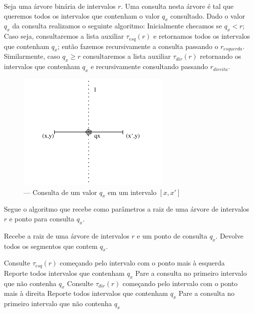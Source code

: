 Seja uma árvore binária de intervalos $r$. Uma consulta nesta árvore é tal que queremos todos os intervalos que contenham o valor $q_x$ consultado.
Dado o valor $q_x$ da consulta realizamos o seguinte algoritmo: Inicialmente checamos se $q_x < r$; Caso seja, consultaremos a lista auxiliar $\tau_{esq}(r)$ e retornamos todos os intervalos que contenham $q_x$; então fazemos recursivamente a consulta passando o $r_{esquerda}$. Similarmente, caso $q_x \geq r $  consultaremos a lista auxiliar $\tau_{dir}(r)$ retornando os intervalos que contenham $q_x$ e recursivamente consultando passando $r_{direita}$.

\begin{figure}[h!]
    \begin{center}
        \includegraphics[scale=1.5]{images/interval_tree_query.pdf}
    \end{center}
    \caption{ — Consulta de um valor $q_x$ em um intervalo $[x, x']$}
    \label{fig:20}
\end{figure}


Segue o algoritmo que recebe como parâmetros a raiz de uma árvore de intervalos $r$ e ponto para consulta $q_x$.

\begin{algorithm}[h!]
    \caption{Recebe a raiz de uma árvore de intervalos $r$ e um ponto de consulta $q_x$. Devolve todos os segmentos que contem $q_x$.}
    \begin{algorithmic}[1]
                    \State Consulte $\tau_{esq}(r)$ começando pelo intervalo com o ponto mais à esquerda
                    \State Reporte todos intervalos que contenham $q_x$
                    \State Pare a consulta no primeiro intervalo que não contenha $q_x$
                    \State {}
                \Else
                    \State Consulte $\tau_{dir}(r)$ começando pelo intervalo com o ponto mais à direita
                    \State Reporte todos intervalos que contenham $q_x$
                    \State Pare a consulta no primeiro intervalo que não contenha $q_x$
                    \State {}
                \EndIf
            \EndIf
        \EndFunction
    \end{algorithmic}
\end{algorithm}

